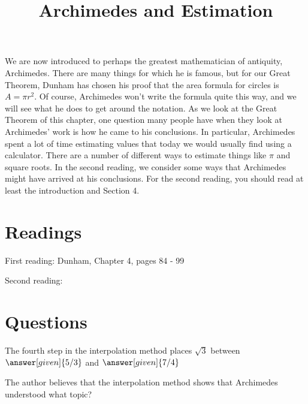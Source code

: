 \documentclass[nooutcomes]{ximera}
\title{Archimedes and Estimation}
\begin{document}
\begin{abstract}
    
\end{abstract}
\maketitle

We are now introduced to perhaps the greatest mathematician of antiquity, Archimedes.  There are many things for which he is famous, but for our Great Theorem, Dunham has chosen his proof that the area formula for circles is $A = \pi r^2$.  Of course, Archimedes won't write the formula quite this way, and we will see what he does to get around the notation.  As we look at the Great Theorem of this chapter, one question many people have when they look at Archimedes' work is how he came to his conclusions.  In particular, Archimedes spent a lot of time estimating values that today we would usually find using a calculator.  There are a number of different ways to estimate things like $\pi$ and square roots.  In the second reading, we consider some ways that Archimedes might have arrived at his conclusions.  For the second reading, you should read at least the introduction and Section 4.


\section{Readings}
First reading: Dunham, Chapter 4, pages 84 - 99

Second reading: 

\section{Questions}

\begin{question}
The fourth step in the interpolation method places $\sqrt{3}$ between $\answer[given]{5/3}$ and $\answer[given]{7/4}$
\end{question}

\begin{question}
The author believes that the interpolation method shows that Archimedes understood what topic?
\begin{multipleChoice}
\end{multipleChoice}
\end{question}



\end{document}
